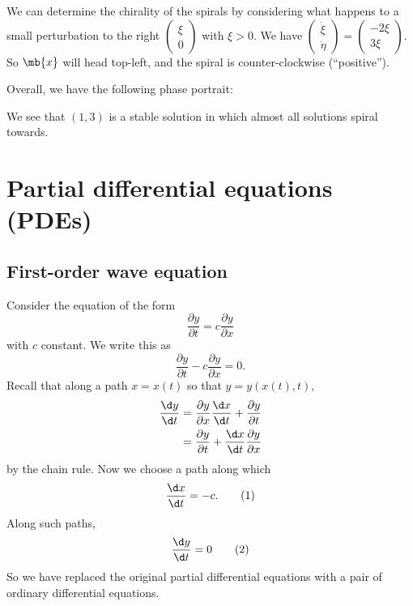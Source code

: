 \documentclass[a4paper]{article}
\begin{document}
\begin{eg}
We can determine the chirality of the spirals by considering what happens to a small perturbation to the right $
\begin{pmatrix}
  \xi\\0
\end{pmatrix}$ with $\xi > 0$. We have $
\begin{pmatrix}
  \dot\xi\\\dot\eta
\end{pmatrix} = 
\begin{pmatrix}
  -2\xi\\3\xi
\end{pmatrix}$. So $\mb{x}$ will head top-left, and the spiral is counter-clockwise (``positive'').






Overall, we have the following phase portrait:

We see that $(1, 3)$ is a stable solution in which almost all solutions spiral towards. 
\end{eg}

\section{Partial differential equations (PDEs)}
\subsection{First-order wave equation}
Consider the equation of the form
\[
\frac{\partial y}{\partial t} = c\frac{\partial y}{\partial x}
\]
with $c$ constant. We write this as
\[
\frac{\partial y}{\partial t} - c\frac{\partial y}{\partial x} = 0.
\]
Recall that along a path $x = x(t)$ so that $y = y(x(t), t)$,
\begin{align*}
  \frac{\d y}{\d t} &= \frac{\partial y}{\partial x}\frac{\d x}{\d t} + \frac{\partial y}{\partial t}\\
  &= \frac{\partial y}{\partial t} + \frac{\d x}{\d t}\frac{\partial y}{\partial x}
\end{align*}
by the chain rule. Now we choose a path along which
\[
\frac{\d x}{\d t} = -c. \tag{1}
\] Along such paths,
\[
\frac{\d y}{\d t} = 0 \tag{2}
\]
So we have replaced the original partial differential equations with a pair of ordinary differential equations.
\end{document}
